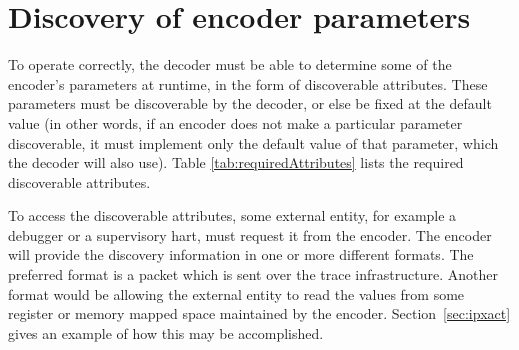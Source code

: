 \section {Discovery of encoder parameters} \label{sec:disco}

To operate correctly, the decoder must be able to determine some of the encoder's parameters 
at runtime, in the form of discoverable attributes.  These parameters must be discoverable by the 
decoder, or else be fixed at the default value (in other words, if an encoder does not make a 
particular parameter discoverable, it must implement only the default value of that parameter, 
which the decoder will also use).  Table \ref{tab:requiredAttributes} lists the required 
discoverable attributes.

To access the discoverable attributes, some external entity, for example a debugger or a 
supervisory hart, must request it from the encoder. The encoder will
provide the discovery information in one or more different formats.  
The preferred format is a packet which is sent over the trace infrastructure.
Another format would be allowing the external entity to read the
values from some register or memory mapped space maintained by the encoder.
Section~\ref{sec:ipxact} gives an example of how this may be accomplished.

